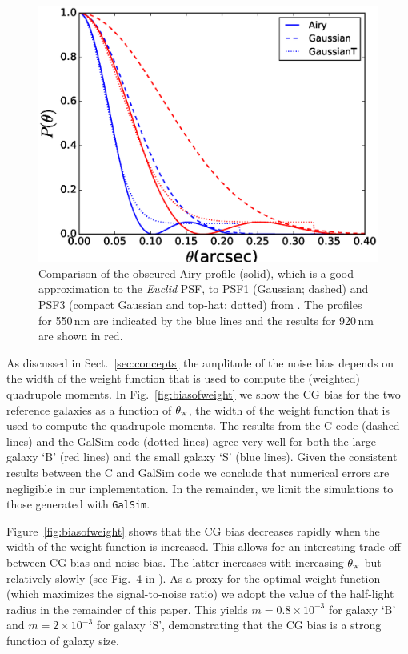 \documentclass[useAMS,usenatbib]{mnras}
\begin{document}
\begin{figure}
\centerline{\includegraphics[width=\hsize]{zairy.eps}}
\caption{Comparison of the obscured Airy profile (solid), which is a good approximation
to the {\it Euclid} PSF, to PSF1 (Gaussian; dashed) and PSF3 (compact Gaussian and 
top-hat; dotted) from . The profiles for 550\,nm are indicated by the blue lines and
the results for 920\,nm are shown in red.}
\label{fig:psfmodel}
\end{figure}
%

As discussed in Sect.~\ref{sec:concepts} the amplitude of the noise bias depends on the width of the weight function that is used to compute the (weighted) quadrupole moments. In Fig.~\ref{fig:biasofweight} we show the CG bias for the two reference galaxies as a function of $\theta_{\rm w}$, the width of the weight function that is used to compute the quadrupole moments. The results from the {\sc C} code (dashed lines) and the {\sc GalSim} code (dotted lines) agree very well for both the large galaxy `B' (red lines) and the small galaxy `S' (blue lines). Given the consistent results between the {\sc C} and {\sc GalSim} code we conclude that numerical errors are negligible in our implementation. In the remainder, we limit the simulations to those generated with {\tt GalSim}.

Figure~\ref{fig:biasofweight} shows that the CG bias decreases rapidly when the width of the weight function is increased. This allows for an interesting trade-off between CG bias and noise bias. The latter increases with increasing $\theta_{\rm w}$ but relatively slowly (see Fig.~4 in ). As a proxy for the optimal weight function (which maximizes the signal-to-noise ratio) we adopt the value of the 
half-light radius in the remainder of this paper. This yields $m=0.8\times10^{-3}$ for galaxy `B' and
$m=2\times10^{-3}$ for galaxy `S', demonstrating that the CG bias is a strong function of galaxy size.
\end{document}
